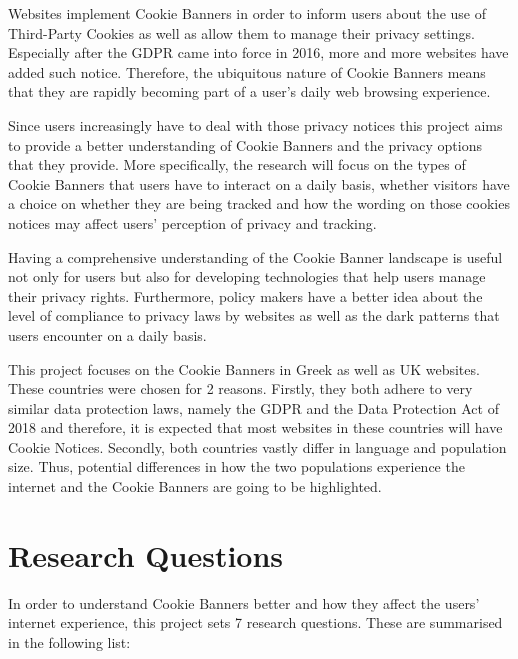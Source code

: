 \documentclass[../main.tex]{subfiles}
\begin{document}
Websites implement Cookie Banners in order to inform users about the use of Third-Party Cookies as well as allow them to manage their privacy settings. Especially after the GDPR came into force in 2016, more and more websites have added such notice. Therefore, the ubiquitous nature of Cookie Banners means that they are rapidly becoming part of a user’s daily web browsing experience.

Since users increasingly have to deal with those privacy notices this project aims to provide a better understanding of Cookie Banners and the privacy options that they provide. More specifically, the research will focus on the types of Cookie Banners that users have to interact on a daily basis, whether visitors have a choice on whether they are being tracked and how the wording on those cookies notices may affect users’ perception of privacy and tracking. 

Having a comprehensive understanding of the Cookie Banner landscape is useful not only for users but also for developing technologies that help users manage their privacy rights. Furthermore, policy makers have a better idea about the level of compliance to privacy laws by websites as well as the dark patterns that users encounter on a daily basis.

This project focuses on the Cookie Banners in Greek as well as UK websites. These countries were chosen for 2 reasons. Firstly, they both adhere to very similar data protection laws, namely the GDPR and the Data Protection Act of 2018 and therefore, it is expected that most websites in these countries will have Cookie Notices. Secondly, both countries vastly differ in language and population size. Thus, potential differences in how the two populations experience the internet and the Cookie Banners are going to be highlighted.

\section{Research Questions}

In order to understand Cookie Banners better and how they affect the users’ internet experience, this project sets 7 research questions. These are summarised in the following list:
\end{document}
